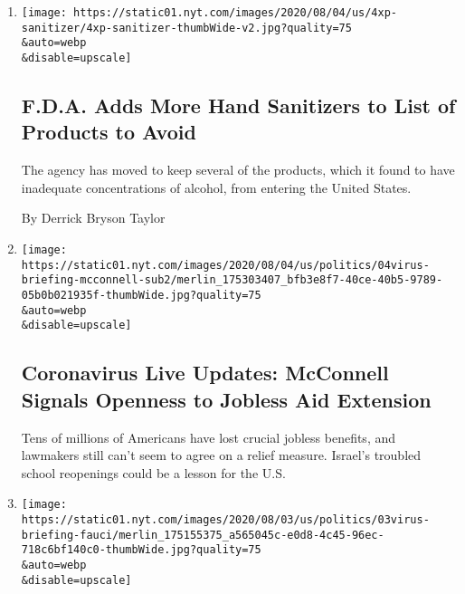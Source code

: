 \begin{enumerate}
\def\labelenumi{\arabic{enumi}.}
\item
  \href{/2020/08/04/health/fda-hand-sanitizer-recall.html}{}

  \texttt{[image: https://static01.nyt.com/images/2020/08/04/us/4xp-sanitizer/4xp-sanitizer-thumbWide-v2.jpg?quality=75\\\&auto=webp\\\&disable=upscale]}

  \hypertarget{fda-adds-more-hand-sanitizers-to-list-of-products-to-avoid}{%
  \subsection{F.D.A. Adds More Hand Sanitizers to List of Products to
  Avoid}\label{fda-adds-more-hand-sanitizers-to-list-of-products-to-avoid}}

  The agency has moved to keep several of the products, which it found
  to have inadequate concentrations of alcohol, from entering the United
  States.

  By Derrick Bryson Taylor
\item
  \href{/2020/08/04/world/coronavirus-cases.html}{}

  \texttt{[image: https://static01.nyt.com/images/2020/08/04/us/politics/04virus-briefing-mcconnell-sub2/merlin\_175303407\_bfb3e8f7-40ce-40b5-9789-05b0b021935f-thumbWide.jpg?quality=75\\\&auto=webp\\\&disable=upscale]}

  \hypertarget{coronavirus-live-updates-mcconnell-signals-openness-to-jobless-aid-extension-1}{%
  \subsection{Coronavirus Live Updates: McConnell Signals Openness to
  Jobless Aid
  Extension}\label{coronavirus-live-updates-mcconnell-signals-openness-to-jobless-aid-extension-1}}

  Tens of millions of Americans have lost crucial jobless benefits, and
  lawmakers still can't seem to agree on a relief measure. Israel's
  troubled school reopenings could be a lesson for the U.S.
\item
  \href{/2020/08/03/world/coronavirus-covid-19.html}{}

  \texttt{[image: https://static01.nyt.com/images/2020/08/03/us/politics/03virus-briefing-fauci/merlin\_175155375\_a565045c-e0d8-4c45-96ec-718c6bf140c0-thumbWide.jpg?quality=75\\\&auto=webp\\\&disable=upscale]}

  \hypertarget{fauci-supports-birxs-coronavirus-assessment-after-trump-criticizes-her}{%
}
\end{enumerate}
